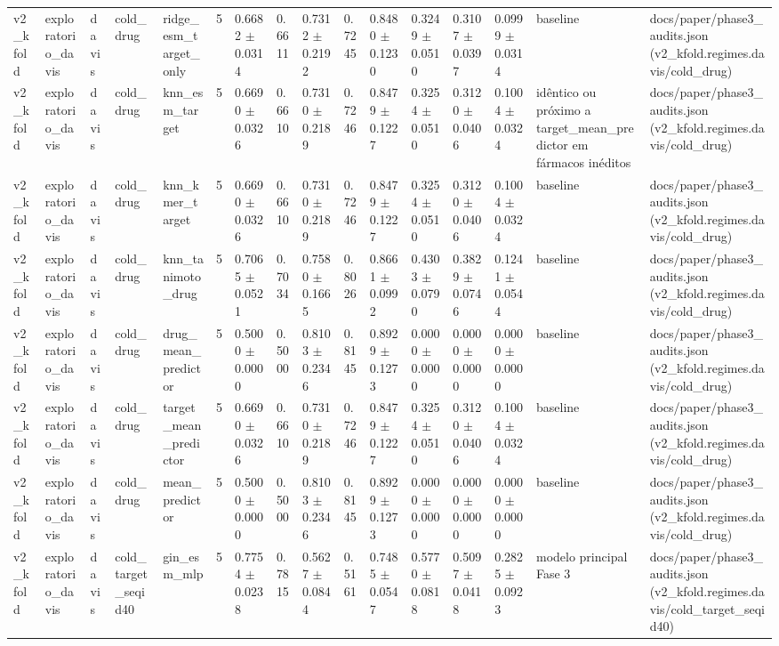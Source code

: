 \begin{table}[htbp]
\begin{tabular}{llllllllllllllll}
v2\_kfold & exploratorio\_davis & davis & cold\_drug & ridge\_esm\_target\_only & 5 & 0.6682 $\pm$ 0.0314 & 0.6611 & 0.7312 $\pm$ 0.2192 & 0.7245 & 0.8480 $\pm$ 0.1230 & 0.3249 $\pm$ 0.0510 & 0.3107 $\pm$ 0.0397 & 0.0999 $\pm$ 0.0314 & baseline & docs/paper/phase3\_audits.json (v2\_kfold.regimes.davis/cold\_drug) \\
v2\_kfold & exploratorio\_davis & davis & cold\_drug & knn\_esm\_target & 5 & 0.6690 $\pm$ 0.0326 & 0.6610 & 0.7310 $\pm$ 0.2189 & 0.7246 & 0.8479 $\pm$ 0.1227 & 0.3254 $\pm$ 0.0510 & 0.3120 $\pm$ 0.0406 & 0.1004 $\pm$ 0.0324 & idêntico ou próximo a target\_mean\_predictor em fármacos inéditos & docs/paper/phase3\_audits.json (v2\_kfold.regimes.davis/cold\_drug) \\
v2\_kfold & exploratorio\_davis & davis & cold\_drug & knn\_kmer\_target & 5 & 0.6690 $\pm$ 0.0326 & 0.6610 & 0.7310 $\pm$ 0.2189 & 0.7246 & 0.8479 $\pm$ 0.1227 & 0.3254 $\pm$ 0.0510 & 0.3120 $\pm$ 0.0406 & 0.1004 $\pm$ 0.0324 & baseline & docs/paper/phase3\_audits.json (v2\_kfold.regimes.davis/cold\_drug) \\
v2\_kfold & exploratorio\_davis & davis & cold\_drug & knn\_tanimoto\_drug & 5 & 0.7065 $\pm$ 0.0521 & 0.7034 & 0.7580 $\pm$ 0.1665 & 0.8026 & 0.8661 $\pm$ 0.0992 & 0.4303 $\pm$ 0.0790 & 0.3829 $\pm$ 0.0746 & 0.1241 $\pm$ 0.0544 & baseline & docs/paper/phase3\_audits.json (v2\_kfold.regimes.davis/cold\_drug) \\
v2\_kfold & exploratorio\_davis & davis & cold\_drug & drug\_mean\_predictor & 5 & 0.5000 $\pm$ 0.0000 & 0.5000 & 0.8103 $\pm$ 0.2346 & 0.8145 & 0.8929 $\pm$ 0.1273 & 0.0000 $\pm$ 0.0000 & 0.0000 $\pm$ 0.0000 & 0.0000 $\pm$ 0.0000 & baseline & docs/paper/phase3\_audits.json (v2\_kfold.regimes.davis/cold\_drug) \\
v2\_kfold & exploratorio\_davis & davis & cold\_drug & target\_mean\_predictor & 5 & 0.6690 $\pm$ 0.0326 & 0.6610 & 0.7310 $\pm$ 0.2189 & 0.7246 & 0.8479 $\pm$ 0.1227 & 0.3254 $\pm$ 0.0510 & 0.3120 $\pm$ 0.0406 & 0.1004 $\pm$ 0.0324 & baseline & docs/paper/phase3\_audits.json (v2\_kfold.regimes.davis/cold\_drug) \\
v2\_kfold & exploratorio\_davis & davis & cold\_drug & mean\_predictor & 5 & 0.5000 $\pm$ 0.0000 & 0.5000 & 0.8103 $\pm$ 0.2346 & 0.8145 & 0.8929 $\pm$ 0.1273 & 0.0000 $\pm$ 0.0000 & 0.0000 $\pm$ 0.0000 & 0.0000 $\pm$ 0.0000 & baseline & docs/paper/phase3\_audits.json (v2\_kfold.regimes.davis/cold\_drug) \\
v2\_kfold & exploratorio\_davis & davis & cold\_target\_seqid40 & gin\_esm\_mlp & 5 & 0.7754 $\pm$ 0.0238 & 0.7815 & 0.5627 $\pm$ 0.0844 & 0.5161 & 0.7485 $\pm$ 0.0547 & 0.5770 $\pm$ 0.0818 & 0.5097 $\pm$ 0.0418 & 0.2825 $\pm$ 0.0923 & modelo principal Fase 3 & docs/paper/phase3\_audits.json (v2\_kfold.regimes.davis/cold\_target\_seqid40) \\

\end{tabular}
\end{table}
